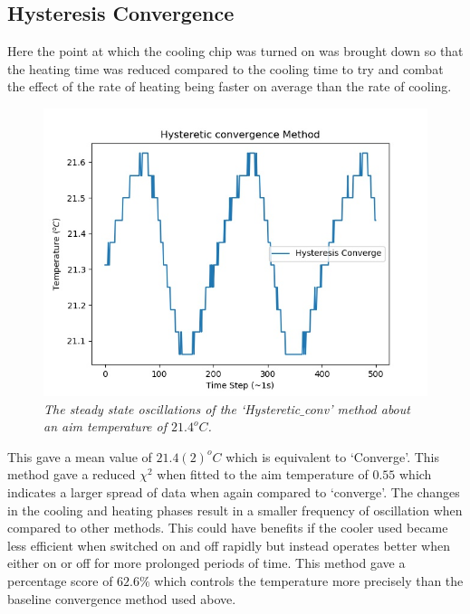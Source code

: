 \documentclass[10pt]{article}
\begin{document}
\subsection*{Hysteresis Convergence}
Here the point at which the cooling chip was turned on was brought down so that the heating time was reduced compared to the cooling time to try and combat the effect of the rate of heating being faster on average than the rate of cooling.\\ 

\begin{figure}[h!]
    \centering
    \includegraphics[scale=0.75]{hyst_conv.jpg}
    \caption{\it{The steady state oscillations of the `Hysteretic$\_$conv' method about an aim temperature of $21.4^oC$.}}
    \label{fig:hyst}
\end{figure}

This gave a mean value of $21.4(2)^oC$ which is equivalent to `Converge'. This method gave a reduced $\chi^2$ when fitted to the aim temperature of $0.55$ which indicates a larger spread of data when again compared to `converge'. The changes in the cooling and heating phases result in a smaller frequency of oscillation when compared to other methods. This could have benefits if the cooler used became less efficient when switched on and off rapidly but instead operates better when either on or off for more prolonged periods of time. This method gave a percentage score of $62.6\%$ which controls the temperature more precisely than the baseline convergence method used above.\\
\end{document}
